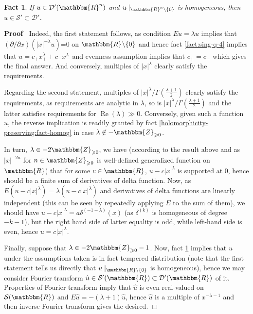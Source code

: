 \documentclass[12pt]{article}
\newcommand{\nin}{\not\in}
\newcommand{\tmop}[1]{\ensuremath{\operatorname{#1}}}
\renewenvironment{proof}{\noindent\textbf{Proof\ }}{\hspace*{\fill}$\Box$\medskip}
\newtheorem{fact}[proposition]{Fact}
\theoremstyle{remark}
\begin{document}
\begin{fact}
\label{fact:homog-tempered}{\cite[thm.
7.1.18]{hormander1983analysis}} If $u \in \mathcal{D}' (\mathbbm{R}^n)$ and $u
\mid_{\mathbbm{R}^n \backslash \{ 0 \}}$ is homogeneous, then $u \in
\mathcal{S}' \subset \mathcal{D}'$.
\end{fact}

\begin{proof}
  Indeed, the first statement follows, as condition $E u = \lambda u$ implies
  that $(\partial / \partial x) (| x |^{- \lambda} u)$=0 on $\mathbbm{R}^{}
  \backslash \{ 0 \}$ and hence fact \ref{fact:sing-q-4} implies that $u = c_+
  x_+^{\lambda} + c_- x_-^{\lambda}$ and evenness assumption implies that $c_+
  = c_-$ which gives the final answer. And conversely, multiples of $| x
  |^{\lambda}$ clearly satisfy the requirements.
  
  Regarding the second statement, multiples of $| x |^{\lambda} / \Gamma
  \left( \frac{\lambda + 1}{2} \right)$ clearly satisfy the requirements, as
  requirements are analytic in $\lambda$, so is $| x |^{\lambda} / \Gamma
  \left( \frac{\lambda + 1}{2} \right)$ and the latter satisfies requirements
  for $\tmop{Re} (\lambda) \gg 0$. Conversely, given such a function $u$, the
  reverse implication is readily granted by fact
  \ref{holomorphicity-preserving:fact-homog} in case $\lambda \nin
  -\mathbbm{Z}_{\geqslant 0}$.
  
  In turn, $\lambda \in - 2\mathbbm{Z}_{\geqslant 0}$, we have (according to
  the result above and as $| x |^{- 2 n}$ for $n \in \mathbbm{Z}_{\geqslant
  0}$ is well-defined generalized function on $\mathbbm{R}$) that for some $c
  \in \mathbbm{R}$, $u - c | x |^{\lambda}$ is supported at $0$, hence should
  be a finite sum of derivatives of delta function. Now, as $E (u - c | x
  |^{\lambda}) = \lambda (u - c | x |^{\lambda})$ and derivatives of delta
  functions are linearly independent (this can be seen by repeatedly applying
  $E$ to the sum of them), we should have $u - c | x |^{\lambda} = a
  \delta^{(- 1 - \lambda)} (x)$ (as $\delta^{(k)}$ is homogeneous of degree $-
  k - 1$), but the right hand side of latter equality is odd, while left-hand
  side is even, hence $u = c | x |^{\lambda}$.
  
  Finally, suppose that $\lambda \in - 2\mathbbm{Z}_{\geqslant 0} - 1$. Now,
  fact \ref{fact:homog-tempered} implies that $u$ under the assumptions taken
  is in fact tempered distribution (note that the first statement tells us
  directly that $u \mid_{\mathbbm{R}\backslash \{ 0 \}}$ is homogeneous),
  hence we may consider Fourier transform $\hat{u} \in \mathcal{S}'
  (\mathbbm{R}) \subset \mathcal{D}' (\mathbbm{R})$ of it. Properties of
  Fourier transform imply that $\hat{u}$ is even real-valued on $\mathcal{S}
  (\mathbbm{R})$ and $E \hat{u} = - (\lambda + 1) \hat{u}$, hence $\hat{u}$ is
  a multiple of $x^{- \lambda - 1}$ and then inverse Fourier transform gives
  the desired.
\end{proof}
\end{document}
